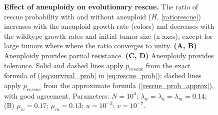 \documentclass[12pt]{extarticle}
\begin{document}
\begin{figure}
\begin{subfigure}{0.5\textwidth}
\end{subfigure}
\caption{\textbf{Effect of aneuploidy on evolutionary rescue.}
The ratio of rescue probability with and without aneuploid ($H$, \cref{ratiorescue}) increases with the aneuploid growth rate (colors) and decreases with the wildtype growth rates and initial tumor size (x-axes), except for large tumors where where the ratio converges to unity.
\textbf{(A, B)} Aneuploidy provides partial resistance.
\textbf{(C, D)} Aneuploidy provides tolerance.  
Solid and dashed lines apply $p_{rescue}$ from the exact formula of  (\cref{eq:survival_prob} in \cref{eq:rescue_prob}); dashed lines apply $p_{rescue}$ from the approximate formula (\cref{rescue_prob_approx}), with good agreement.
Parameters: $N=10^4$; $\lambda_w=\lambda_a=\lambda_m=0.14$; (B) $\mu_w=0.17$; $\mu_m=0.13$; $u=10^{-2}$; $v=10^{-7}$.
}
\label{rescue_ratio}
\end{figure}

\end{document}
